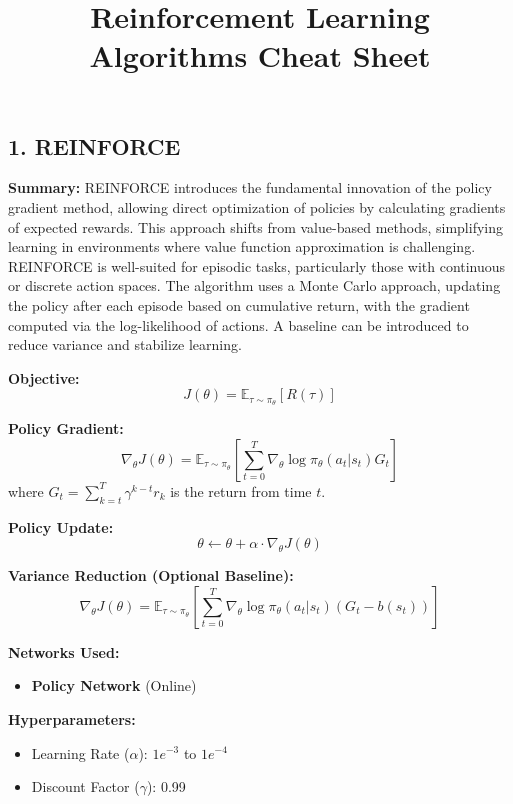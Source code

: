 \documentclass[a4paper,10pt]{article}
\title{\vspace{-4cm}Reinforcement Learning Algorithms Cheat Sheet}
\author{}
\date{}
\begin{document}
\maketitle
\footnotesize
\begin{multicols}{2}

\section*{1. REINFORCE}
\textbf{Summary:} REINFORCE introduces the fundamental innovation of the policy gradient method, allowing direct optimization of policies by calculating gradients of expected rewards. This approach shifts from value-based methods, simplifying learning in environments where value function approximation is challenging. REINFORCE is well-suited for episodic tasks, particularly those with continuous or discrete action spaces. The algorithm uses a Monte Carlo approach, updating the policy after each episode based on cumulative return, with the gradient computed via the log-likelihood of actions. A baseline can be introduced to reduce variance and stabilize learning.

\textbf{Objective:}
\[
J(\theta) = \mathbb{E}_{\tau \sim \pi_\theta} \left[ R(\tau) \right]
\]

\textbf{Policy Gradient:}
\[
\nabla_\theta J(\theta) = \mathbb{E}_{\tau \sim \pi_\theta} \left[ \sum_{t=0}^{T} \nabla_\theta \log \pi_\theta(a_t | s_t) G_t \right]
\]
where \( G_t = \sum_{k=t}^{T} \gamma^{k-t} r_k \) is the return from time \( t \).

\textbf{Policy Update:}
\[
\theta \leftarrow \theta + \alpha \cdot \nabla_\theta J(\theta)
\]

\textbf{Variance Reduction (Optional Baseline):}
\[
\nabla_\theta J(\theta) = \mathbb{E}_{\tau \sim \pi_\theta} \left[ \sum_{t=0}^{T} \nabla_\theta \log \pi_\theta(a_t | s_t) \left( G_t - b(s_t) \right) \right]
\]

\textbf{Networks Used:} 
\begin{itemize}
    \item \textbf{Policy Network} (Online)
\end{itemize}

\textbf{Hyperparameters:}
\begin{itemize}
    \item Learning Rate (\(\alpha\)): \(1e^{-3}\) to \(1e^{-4}\)
    \item Discount Factor (\(\gamma\)): 0.99
\end{itemize}


\end{multicols}
\end{document}
